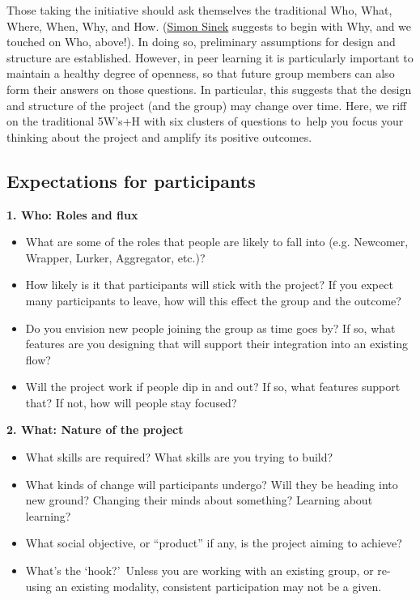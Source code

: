 Those taking the initiative should ask themselves the traditional Who,
What, Where, When, Why, and How.
(\href{http://en.wikipedia.org/wiki/Simon_Sinek}{Simon Sinek} suggests
to begin with Why, and we touched on Who, above!). In doing so,
preliminary assumptions for design and structure are established.
However, in peer learning it is particularly important to maintain a
healthy degree of openness, so that future group members can also form
their answers on those questions. In particular, this suggests that the
design and structure of the project (and the group) may change over
time. Here, we riff on the traditional 5W's+H with six clusters of
questions to~help you focus your thinking about the project and amplify
its positive outcomes.

\hypertarget{expectations-for-participants}{%
\subsection{Expectations for
participants}\label{expectations-for-participants}}

\textbf{1. Who: Roles and flux}

\begin{itemize}
\tightlist
\item
  What are some of the roles that people are likely to fall into (e.g.
  Newcomer, Wrapper, Lurker, Aggregator, etc.)?
\item
  How likely is it that participants will stick with the project? If you
  expect many participants to leave, how will this effect the group and
  the outcome?
\item
  Do you envision new people joining the group as time goes by? If so,
  what features are you designing that will support their integration
  into an existing flow?
\item
  Will the project work if people dip in and out? If so, what features
  support that? If not, how will people stay focused?
\end{itemize}

\textbf{2. What: Nature of the project}

\begin{itemize}
\tightlist
\item
  What skills are required? What skills are you trying to build?
\item
  What kinds of change will participants undergo? Will they be heading
  into new ground? Changing their minds about something? Learning about
  learning?
\item
  What social objective, or ``product'' if any, is the project aiming to
  achieve?
\item
  What's the `hook?'~Unless you are working with an existing group, or
  re-using an existing modality, consistent participation may not be a
  given.
\end{itemize}

